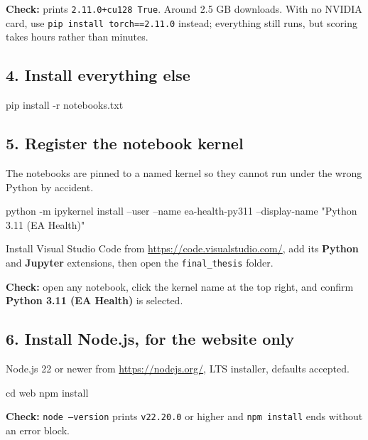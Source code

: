 \noindent \textbf{Check:} prints \texttt{2.11.0+cu128 True}. Around 2.5 GB downloads. With no
NVIDIA card, use \texttt{pip install torch==2.11.0} instead; everything still runs, but scoring
takes hours rather than minutes.

\subsection*{4. Install everything else}

\begin{cmd}
pip install -r notebooks\requirements.txt
\end{cmd}


\subsection*{5. Register the notebook kernel}

The notebooks are pinned to a named kernel so they cannot run under the wrong Python by accident.

\begin{cmd}
python -m ipykernel install --user --name ea-health-py311 --display-name "Python 3.11 (EA Health)"
\end{cmd}

\noindent Install Visual Studio Code from \url{https://code.visualstudio.com/}, add its
\textbf{Python} and \textbf{Jupyter} extensions, then open the \texttt{final\_thesis} folder.

\noindent \textbf{Check:} open any notebook, click the kernel name at the top right, and confirm
\textbf{Python 3.11 (EA Health)} is selected.


\subsection*{6. Install Node.js, for the website only}

Node.js 22 or newer from \url{https://nodejs.org/}, LTS installer, defaults accepted.

\begin{cmd}
cd web\website
npm install
\end{cmd}

\noindent \textbf{Check:} \texttt{node --version} prints \texttt{v22.20.0} or higher and
\texttt{npm install} ends without an error block.
